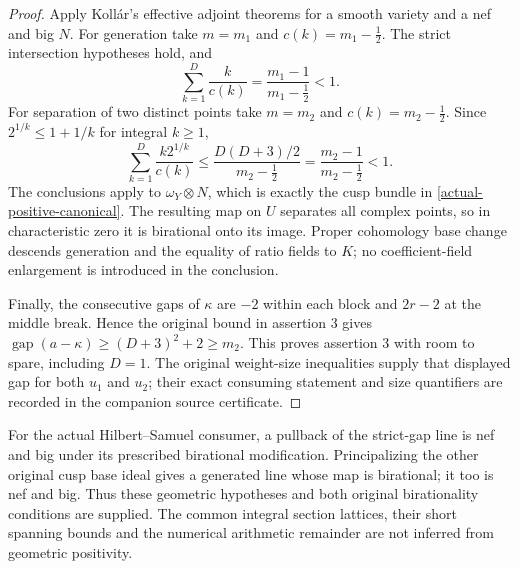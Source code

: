 \begin{proof}
Apply Koll\'ar's effective adjoint theorems for a smooth variety
and a nef and big $N$\cite[Theorems 5.8--5.9]{positive-kollar}.
For generation take $m=m_1$ and $c(k)=m_1-\tfrac12$.
The strict intersection hypotheses hold, and
\[
 \sum_{k=1}^D\frac{k}{c(k)}
       =\frac{m_1-1}{m_1-\tfrac12}<1.
\]
For separation of two distinct points take $m=m_2$ and
$c(k)=m_2-\tfrac12$. Since
$2^{1/k}\le1+1/k$ for integral $k\ge1$,
\[
 \sum_{k=1}^D\frac{k2^{1/k}}{c(k)}
 \le\frac{D(D+3)/2}{m_2-\tfrac12}
 =\frac{m_2-1}{m_2-\tfrac12}<1.
\]
The conclusions apply to $\omega_Y\otimes N$, which is
exactly the cusp bundle in \eqref{actual-positive-canonical}.
The resulting map on $U$ separates all complex points, so in
characteristic zero it is birational onto its image. Proper
cohomology base change descends generation and the equality
of ratio fields to $K$; no coefficient-field enlargement is
introduced in the conclusion.

Finally, the consecutive gaps of $\kappa$ are $-2$ within
each block and $2r-2$ at the middle break. Hence the original
bound in assertion 3 gives
$\operatorname{gap}(a-\kappa)\ge(D+3)^2+2\ge m_2$.
This proves assertion 3 with room to spare, including $D=1$.
The original weight-size inequalities supply that displayed gap
for both $u_1$ and $u_2$; their exact consuming statement and
size quantifiers are recorded in the companion source certificate.
\end{proof}

For the actual Hilbert--Samuel consumer, a pullback of the
strict-gap line is nef and big under its prescribed birational
modification. Principalizing the other original cusp base ideal
gives a generated line whose map is birational; it too is nef
and big. Thus these geometric hypotheses and both original
birationality conditions are supplied. The common integral
section lattices, their short spanning bounds and the numerical
arithmetic remainder are not inferred from geometric positivity.
